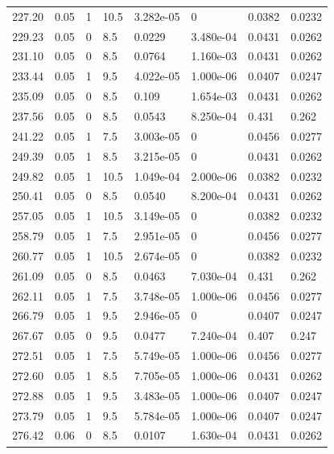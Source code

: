 \documentclass[preview]{standalone}
\begin{document}
{{{\begin{tabular}{L{1.2cm}C{1.2cm} C{0.3cm}C{0.5cm} C{1.4cm}C{1.4cm} C{1.4cm}C{1.4cm}}
  227.20  &  0.05  & 1     & 10.5 &  3.282e-05  & 0  & 0.0382 &  0.0232   \\ 
  229.23  &  0.05  & 0     & 8.5 &  0.0229  & 3.480e-04  & 0.0431 &  0.0262   \\ 
  231.10  &  0.05  & 0     & 8.5 &  0.0764  & 1.160e-03  & 0.0431 &  0.0262   \\ 
  233.44  &  0.05  & 1     & 9.5 &  4.022e-05  & 1.000e-06  & 0.0407 &  0.0247   \\ 
  235.09  &  0.05  & 0     & 8.5 &  0.109  & 1.654e-03  & 0.0431 &  0.0262   \\ 
  237.56  &  0.05  & 0     & 8.5 &  0.0543  & 8.250e-04  & 0.431 &  0.262   \\ 
  241.22  &  0.05  & 1     & 7.5 &  3.003e-05  & 0  & 0.0456 &  0.0277   \\ 
  249.39  &  0.05  & 1     & 8.5 &  3.215e-05  & 0  & 0.0431 &  0.0262   \\ 
  249.82  &  0.05  & 1     & 10.5 &  1.049e-04  & 2.000e-06  & 0.0382 &  0.0232   \\ 
  250.41  &  0.05  & 0     & 8.5 &  0.0540  & 8.200e-04  & 0.0431 &  0.0262   \\ 
  257.05  &  0.05  & 1     & 10.5 &  3.149e-05  & 0  & 0.0382 &  0.0232   \\ 
  258.79  &  0.05  & 1     & 7.5 &  2.951e-05  & 0  & 0.0456 &  0.0277   \\ 
  260.77  &  0.05  & 1     & 10.5 &  2.674e-05  & 0  & 0.0382 &  0.0232   \\ 
  261.09  &  0.05  & 0     & 8.5 &  0.0463  & 7.030e-04  & 0.431 &  0.262   \\ 
  262.11  &  0.05  & 1     & 7.5 &  3.748e-05  & 1.000e-06  & 0.0456 &  0.0277   \\ 
  266.79  &  0.05  & 1     & 9.5 &  2.946e-05  & 0  & 0.0407 &  0.0247   \\ 
  267.67  &  0.05  & 0     & 9.5 &  0.0477  & 7.240e-04  & 0.407 &  0.247   \\ 
  272.51  &  0.05  & 1     & 7.5 &  5.749e-05  & 1.000e-06  & 0.0456 &  0.0277   \\ 
  272.60  &  0.05  & 1     & 8.5 &  7.705e-05  & 1.000e-06  & 0.0431 &  0.0262   \\ 
  272.88  &  0.05  & 1     & 9.5 &  3.483e-05  & 1.000e-06  & 0.0407 &  0.0247   \\ 
  273.79  &  0.05  & 1     & 9.5 &  5.784e-05  & 1.000e-06  & 0.0407 &  0.0247   \\ 
  276.42  &  0.06  & 0     & 8.5 &  0.0107  & 1.630e-04  & 0.0431 &  0.0262   \\ 

\end{tabular}}}}
\end{document}
